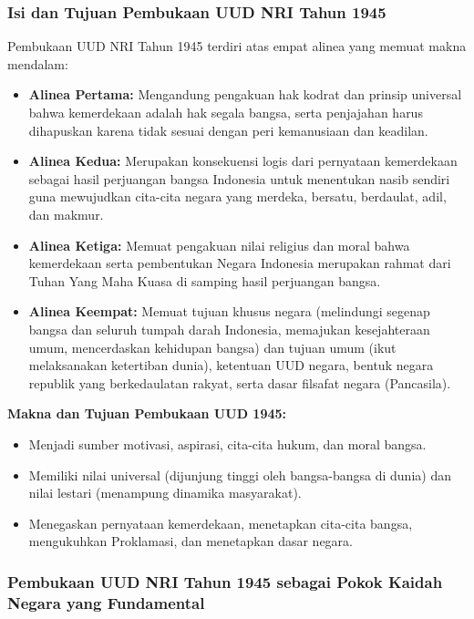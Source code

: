\subsubsection{Isi dan Tujuan Pembukaan UUD NRI Tahun 1945}

Pembukaan UUD NRI Tahun 1945 terdiri atas empat alinea yang memuat makna mendalam:
\begin{itemize}
\item \textbf{Alinea Pertama:} Mengandung pengakuan hak kodrat dan prinsip universal bahwa kemerdekaan adalah hak segala bangsa, serta penjajahan harus dihapuskan karena tidak sesuai dengan peri kemanusiaan dan keadilan.
\item \textbf{Alinea Kedua:} Merupakan konsekuensi logis dari pernyataan kemerdekaan sebagai hasil perjuangan bangsa Indonesia untuk menentukan nasib sendiri guna mewujudkan cita-cita negara yang merdeka, bersatu, berdaulat, adil, dan makmur.
\item \textbf{Alinea Ketiga:} Memuat pengakuan nilai religius dan moral bahwa kemerdekaan serta pembentukan Negara Indonesia merupakan rahmat dari Tuhan Yang Maha Kuasa di samping hasil perjuangan bangsa.
\item \textbf{Alinea Keempat:} Memuat tujuan khusus negara (melindungi segenap bangsa dan seluruh tumpah darah Indonesia, memajukan kesejahteraan umum, mencerdaskan kehidupan bangsa) dan tujuan umum (ikut melaksanakan ketertiban dunia), ketentuan UUD negara, bentuk negara republik yang berkedaulatan rakyat, serta dasar filsafat negara (Pancasila).
\end{itemize}

\textbf{Makna dan Tujuan Pembukaan UUD 1945:}
\begin{itemize}
\item Menjadi sumber motivasi, aspirasi, cita-cita hukum, dan moral bangsa.
\item Memiliki nilai universal (dijunjung tinggi oleh bangsa-bangsa di dunia) dan nilai lestari (menampung dinamika masyarakat).
\item Menegaskan pernyataan kemerdekaan, menetapkan cita-cita bangsa, mengukuhkan Proklamasi, dan menetapkan dasar negara.
\end{itemize}

\subsubsection{Pembukaan UUD NRI Tahun 1945 sebagai Pokok Kaidah Negara yang Fundamental}

